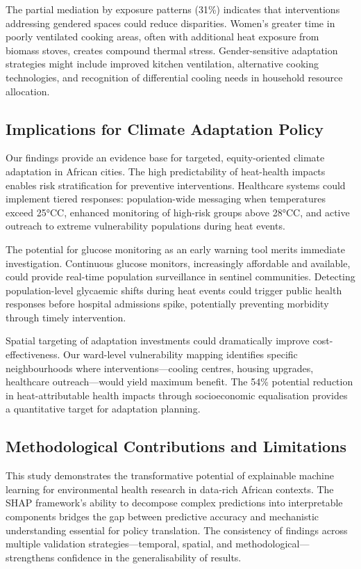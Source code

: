 \documentclass[11pt,a4paper]{article}
\newcommand{\degrees}{°C}
\begin{document}
The partial mediation by exposure patterns (31\%) indicates that interventions addressing gendered spaces could reduce disparities. Women's greater time in poorly ventilated cooking areas, often with additional heat exposure from biomass stoves, creates compound thermal stress. Gender-sensitive adaptation strategies might include improved kitchen ventilation, alternative cooking technologies, and recognition of differential cooling needs in household resource allocation.

\subsection{Implications for Climate Adaptation Policy}

Our findings provide an evidence base for targeted, equity-oriented climate adaptation in African cities. The high predictability of heat-health impacts enables risk stratification for preventive interventions. Healthcare systems could implement tiered responses: population-wide messaging when temperatures exceed 25\degrees C, enhanced monitoring of high-risk groups above 28\degrees C, and active outreach to extreme vulnerability populations during heat events.

The potential for glucose monitoring as an early warning tool merits immediate investigation. Continuous glucose monitors, increasingly affordable and available, could provide real-time population surveillance in sentinel communities. Detecting population-level glycaemic shifts during heat events could trigger public health responses before hospital admissions spike, potentially preventing morbidity through timely intervention.

Spatial targeting of adaptation investments could dramatically improve cost-effectiveness. Our ward-level vulnerability mapping identifies specific neighbourhoods where interventions---cooling centres, housing upgrades, healthcare outreach---would yield maximum benefit. The 54\% potential reduction in heat-attributable health impacts through socioeconomic equalisation provides a quantitative target for adaptation planning.

\subsection{Methodological Contributions and Limitations}

This study demonstrates the transformative potential of explainable machine learning for environmental health research in data-rich African contexts. The SHAP framework's ability to decompose complex predictions into interpretable components bridges the gap between predictive accuracy and mechanistic understanding essential for policy translation. The consistency of findings across multiple validation strategies---temporal, spatial, and methodological---strengthens confidence in the generalisability of results.
\end{document}
